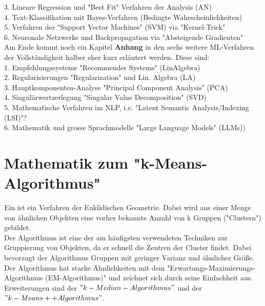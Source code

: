 \documentclass[12pt]{article}
\begin{document}
3. Lineare Regression und "Best Fit" Verfahren der Analysis (AN)\\

4. Text-Klassifikation mit Bayes-Verfahren (Bedingte Wahrscheinlichkeiten)\\
 
5. Verfahren der "Support Vector Machines" (SVM) via "Kernel-Trick"\\

6. Neuronale Netzwerke und Backpropagation via "Absteigende Gradienten"\\[0.2cm]
%
Am Ende kommt noch ein Kapitel \textbf{Anhang} in den sechs weitere ML-Verfahren der Vollständigkeit halber eher kurz erläutert werden. Diese sind:\\

1. Empfehlungssysteme "Recommender Systems" (LinAlgebra)\\

2. Regularisierungen "Regularization" und Lin. Algebra (LA)\\

3. Hauptkomponenten-Analyse "Principal Component Analysis" (PCA)\\
 
4. Singulärwertzerlegung "Singular Value Decomposition" (SVD)\\
 
5. Mathematische Verfahren im NLP, i.e. "Latent Semantic Analysis/Indexing (LSI)"?\\

6. Mathematik und grosse Sprachmodelle "Large Language Models" (LLMs))

\newpage

\section{Mathematik zum "k-Means-Algorithmus" \\}

Ein {\color{blue}{k-Means-Algorithmus}} ist ein Verfahren der Euklidischen Geometrie. Dabei wird aus einer Menge von ähnlichen Objekten eine vorher bekannte Anzahl von k Gruppen ("Clustern") gebildet.\\
Der Algorithmus ist eine der am häufigsten verwendeten Techniken zur Gruppierung von Objekten, da er schnell die Zentren der Cluster findet. Dabei bevorzugt der Algorithmus Gruppen mit geringer Varianz und ähnlicher Größe.\\
Der Algorithmus hat starke Ähnlichkeiten mit dem "Erwartungs-Maximierungs-Algorithmus (EM-Algorithmus)" und zeichnet sich durch seine Einfachheit aus.\\
Erweiterungen sind der $"k-Median-Algorithmus"$ und der $"k-Means++ Algorithmus" $.\\
\end{document}
